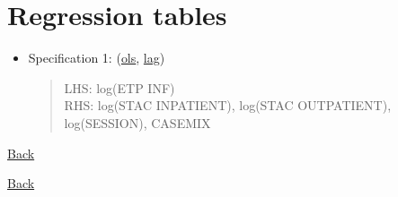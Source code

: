 \newpage
\section{Regression tables} \hypertarget{home}{}

\begin{itemize}
    \item Specification 1: (\hyperlink{reg_inf_ols_2016}{ols},
          \hyperlink{reg_inf_lag_2016}{lag})
          \begin{quote}
              LHS: log(ETP INF)\\
              RHS: log(STAC INPATIENT), log(STAC OUTPATIENT), log(SESSION), CASEMIX
          \end{quote}
\end{itemize}

\newpage

\hypertarget{reg_inf_ols_2022}{}\hyperlink{home}{Back}
\bigskip

\hypertarget{reg_inf_lag_2022}{}\hyperlink{home}{Back}